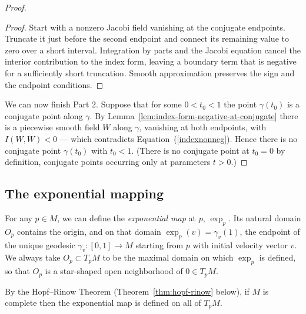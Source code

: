 \begin{proof}
\begin{proof}
\sketch
{}

Start with a nonzero Jacobi field vanishing at the conjugate endpoints. Truncate it just before the second endpoint and connect its remaining value to zero over a short interval. Integration by parts and the Jacobi equation cancel the interior contribution to the index form, leaving a boundary term that is negative for a sufficiently short truncation. Smooth approximation preserves the sign and the endpoint conditions.
\end{proof}

We can now finish Part 2. Suppose that for some $0<t_0<1$ the point
$\gamma(t_0)$ is a conjugate point along $\gamma$. By
Lemma~\ref{lem:index-form-negative-at-conjugate} there is a piecewise smooth
field $W$ along $\gamma$, vanishing at both endpoints, with $I(W,W)<0$ --- which
contradicts Equation~(\ref{indexnonneg}). Hence there is no conjugate point
$\gamma(t_0)$ with $t_0<1$. (There is no conjugate point at $t_0=0$ by
definition, conjugate points occurring only at parameters $t>0$.)
\end{proof}






\subsection{The exponential mapping}


\begin{definition}
\label{def:exponential-map}




For any $p\in M$, we can define the \textit{exponential
map} at $p$, $\exp_{p}$. Its natural domain $O_p$ contains the origin,
and on that domain $\exp_{p}(v)=\gamma_v(1)$, the endpoint of
the unique geodesic $\gamma_v\colon [0,1]\rightarrow M$ starting
from $p$ with initial velocity vector $v$. We always take
$O_{p}\subset T_{p}M$ to be the maximal domain on which $\exp_p$ is
defined, so that $O_p$ is a star-shaped open neighborhood of
$0\in T_pM$.
\end{definition}

By the Hopf--Rinow Theorem (Theorem~\ref{thm:hopf-rinow} below),
if $M$ is complete then the exponential map is defined on all of
$T_pM$.

